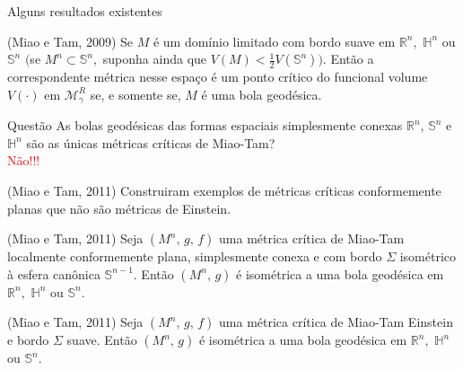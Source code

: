 \documentclass[blue]{beamer}
\begin{document}
\begin{frame}{Alguns resultados existentes}\pause
\begin{block}{(Miao e Tam, 2009)}
Se $M$ é um domínio limitado com bordo suave em $\mathbb{R}^n,$ $\mathbb{H}^n$ ou $\mathbb{S}^n$ $($se
$M^n\subset\mathbb{S}^n,$ suponha ainda que $V(M)<\frac{1}{2}V(\mathbb{S}^n)).$ Então a correspondente métrica
nesse espaço é um ponto crítico do funcional volume $V(\cdot)$ em $\mathcal{M}_\gamma^{R}$ se, e somente se, $M$
é uma bola geodésica.
\end{block}\pause
\begin{block}{Questão}
As bolas geodésicas das formas espaciais simplesmente conexas $\mathbb{R}^n$, $\mathbb{S}^{n}$ e $\mathbb{H}^n$ são as únicas métricas críticas de Miao-Tam?\pause
\\\textcolor{red}{Não!!!}
\end{block}\pause
\begin{block}{(Miao e Tam, 2011)}
Construiram exemplos de métricas críticas conformemente planas que não são  métricas de Einstein.	
\end{block}
\end{frame}

\begin{frame}

\begin{block}{(Miao e Tam, 2011)}
	Seja $(M^n,\,g,\,f)$ uma métrica crítica de Miao-Tam localmente conformemente plana, simplesmente conexa e com bordo $\Sigma$ isométrico à esfera canônica $\mathbb{S}^{n-1}$. Então $(M^n,\,g)$ é isométrica a uma bola geodésica em $\mathbb{R}^n,$ $\mathbb{H}^n$ ou $\mathbb{S}^n.$
\end{block}\pause 

\begin{block}{(Miao e Tam, 2011)}
Seja $(M^n,\,g,\,f)$ uma métrica crítica de Miao-Tam Einstein e bordo $\Sigma$ suave. Então $(M^n,\,g)$ é isométrica a uma bola geodésica em $\mathbb{R}^n,$ $\mathbb{H}^n$ ou $\mathbb{S}^n.$
\end{block}

\end{frame}
\end{document}
